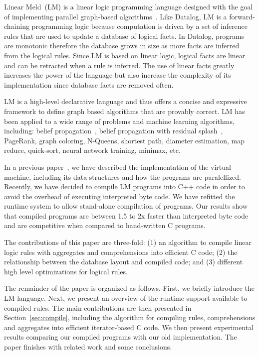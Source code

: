 Linear Meld~(LM) is a linear logic programming language
designed with the goal of implementing parallel graph-based
algorithms~\cite{cruz-iclp14}. Like Datalog, LM is
a forward-chaining programming logic because computation is driven by a set of
inference rules that are used to update a database of logical facts. In Datalog,
programs are monotonic therefore the database grows in size as more facts are
inferred from the logical rules. Since LM is based on linear logic, logical
facts are linear and can be retracted when a rule is inferred. The use of linear
facts greatly increases the power of the language but also increase the
complexity of its implementation since database facts are removed often.

LM is a high-level declarative language and thus offers a concise and
expressive framework to define graph based algorithms that are provably correct.
LM has been applied to a wide range of problems and machine learning
algorithms, including: belief propagation~\cite{Gonzalez+al:aistats09paraml},
belief propagation with residual splash~\cite{Gonzalez+al:aistats09paraml},
PageRank, graph coloring, N-Queens, shortest path, diameter estimation,
map reduce, quick-sort, neural network training, minimax, etc.

In a previous paper~\cite{cruz-ppdp14}, we have described the implementation of the
virtual machine, including its data structures and how the programs are
paralellized. Recently, we have decided to compile LM programs into C++ code in
order to avoid the overhead of executing interpreted byte code. We have refitted
the runtime system to allow stand-alone compilation of programs.
Our results show that compiled programs are between 1.5 to 2x faster than
interpreted byte code and are competitive when compared to hand-written C
programs.

The contributions of this paper are three-fold: (1) an algorithm to compile linear
logic rules with aggregates and comprehensions into efficient C code; (2)
the relationship between the database layout and compiled code; and (3)
different high level optimizations for logical rules.

The remainder of the paper is organized as follows. First, we briefly introduce
the LM language. Next, we present an overview of the runtime support available
to compiled rules. The main contributions are then presented in
Section~\ref{sec:compile}, including the algorithm for compiling rules,
comprehensions and aggregates into efficient iterator-based C code. We then
present experimental results comparing our compiled programs with our old
implementation. The paper finishes with related work and some conclusions.
